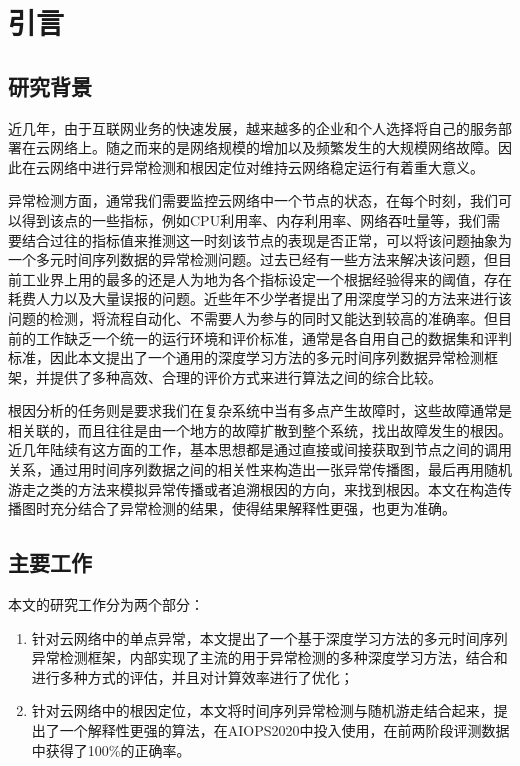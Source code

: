
\chapter{引言}
\label{cha:intro}

\section{研究背景}
近几年，由于互联网业务的快速发展，越来越多的企业和个人选择将自己的服务部署在云网络上。随之而来的是网络规模的增加以及频繁发生的大规模网络故障。因此在云网络中进行异常检测和根因定位对维持云网络稳定运行有着重大意义。

异常检测方面，通常我们需要监控云网络中一个节点的状态，在每个时刻，我们可以得到该点的一些指标，例如CPU利用率、内存利用率、网络吞吐量等，我们需要结合过往的指标值来推测这一时刻该节点的表现是否正常，可以将该问题抽象为一个多元时间序列数据的异常检测问题。过去已经有一些方法来解决该问题，但目前工业界上用的最多的还是人为地为各个指标设定一个根据经验得来的阈值，存在耗费人力以及大量误报的问题。近些年不少学者\cite{an2015variational,malhotra2015long,malhotra2016lstm,nguyen2018anomaly,park2018multimodal,ruff2018deep,su2019robust,zong2018deep,xu2018unsupervised,siffer2017anomaly}提出了用深度学习的方法来进行该问题的检测，将流程自动化、不需要人为参与的同时又能达到较高的准确率。但目前的工作缺乏一个统一的运行环境和评价标准，通常是各自用自己的数据集和评判标准，因此本文提出了一个通用的深度学习方法的多元时间序列数据异常检测框架，并提供了多种高效、合理的评价方式来进行算法之间的综合比较。

根因分析的任务则是要求我们在复杂系统中当有多点产生故障时，这些故障通常是相关联的，而且往往是由一个地方的故障扩散到整个系统，找出故障发生的根因。近几年陆续有这方面的工作\cite{lin2016automated,weng2018root,wu2020microrca}，基本思想都是通过直接或间接获取到节点之间的调用关系，通过用时间序列数据之间的相关性来构造出一张异常传播图，最后再用随机游走之类的方法来模拟异常传播或者追溯根因的方向，来找到根因。本文在构造传播图时充分结合了异常检测的结果，使得结果解释性更强，也更为准确。


\section{主要工作}
本文的研究工作分为两个部分：

\begin{enumerate}
    \item 针对云网络中的单点异常，本文提出了一个基于深度学习方法的多元时间序列异常检测框架，内部实现了主流的用于异常检测的多种深度学习方法，结合\cite{tatbul2018precision}和\cite{siffer2017anomaly}进行多种方式的评估，并且对计算效率进行了优化；
    \item 针对云网络中的根因定位，本文将时间序列异常检测与随机游走结合起来，提出了一个解释性更强的算法，在AIOPS2020中投入使用，在前两阶段评测数据中获得了100\%的正确率。
\end{enumerate}
